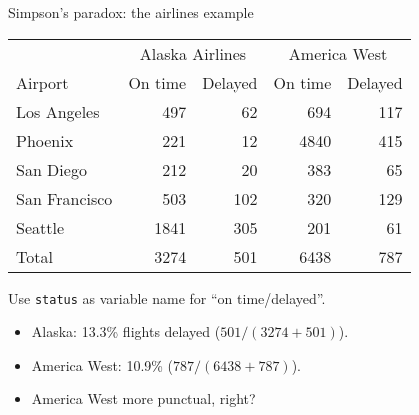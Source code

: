 \begin{frame}[fragile]{Simpson's paradox: the airlines example}

  \begin{tabular}{|l|rr|rr|}
    \hline
    & \multicolumn{2}{|c|}{Alaska Airlines} & 
    \multicolumn{2}{|c|}{America West}\\
    Airport & On time & Delayed & On time & Delayed\\
    \hline
    Los Angeles & 497 & 62 & 694 & 117\\
    Phoenix & 221 & 12 & 4840 & 415\\
    San Diego & 212 & 20 & 383 & 65\\
    San Francisco & 503 & 102 & 320 & 129 \\
    Seattle & 1841 & 305 & 201 & 61\\
    \hline
    Total & 3274 & 501 & 6438 & 787\\
    \hline
  \end{tabular}
  
  \vspace{2ex}
  
  Use \texttt{status} as variable name for ``on time/delayed''.

   \begin{itemize}
   \item Alaska: 13.3\% flights delayed ($501/(3274+501)$).
   \item America West: 10.9\% ($787/(6438+787)$).
   \item America West more punctual, right?
   \end{itemize}
 
\end{frame}

